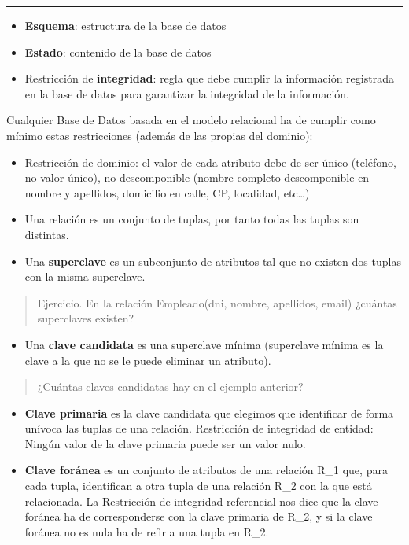 \documentclass[]{book}
\providecommand{\tightlist}{%
  \setlength{\itemsep}{0pt}\setlength{\parskip}{0pt}}
\begin{document}
\begin{center}\rule{0.5\linewidth}{0.5pt}\end{center}

\begin{itemize}
\item
  \textbf{Esquema}: estructura de la base de datos
\item
  \textbf{Estado}: contenido de la base de datos
\item
  Restricción de \textbf{integridad}: regla que debe cumplir la
  información registrada en la base de datos para garantizar la
  integridad de la información.
\end{itemize}

Cualquier Base de Datos basada en el modelo relacional ha de cumplir
como mínimo estas restricciones (además de las propias del dominio):

\begin{itemize}
\item
  Restricción de dominio: el valor de cada atributo debe de ser único
  (teléfono, no valor único), no descomponible (nombre completo
  descomponible en nombre y apellidos, domicilio en calle, CP,
  localidad, etc\ldots{})
\item
  Una relación es un conjunto de tuplas, por tanto todas las tuplas son
  distintas.
\item
  Una \textbf{superclave} es un subconjunto de atributos tal que no
  existen dos tuplas con la misma superclave.
\end{itemize}

\begin{quote}
Ejercicio. En la relación Empleado(dni, nombre, apellidos, email)
¿cuántas superclaves existen?
\end{quote}

\begin{itemize}
\tightlist
\item
  Una \textbf{clave candidata} es una superclave mínima (superclave
  mínima es la clave a la que no se le puede eliminar un atributo).
\end{itemize}

\begin{quote}
¿Cuántas claves candidatas hay en el ejemplo anterior?
\end{quote}

\begin{itemize}
\item
  \textbf{Clave primaria} es la clave candidata que elegimos que
  identificar de forma unívoca las tuplas de una relación. Restricción
  de integridad de entidad: Ningún valor de la clave primaria puede ser
  un valor nulo.
\item
  \textbf{Clave foránea} es un conjunto de atributos de una relación
  R\_1 que, para cada tupla, identifican a otra tupla de una relación
  R\_2 con la que está relacionada. La Restricción de integridad
  referencial nos dice que la clave foránea ha de corresponderse con la
  clave primaria de R\_2, y si la clave foránea no es nula ha de refir a
  una tupla en R\_2.
\end{itemize}
\end{document}
